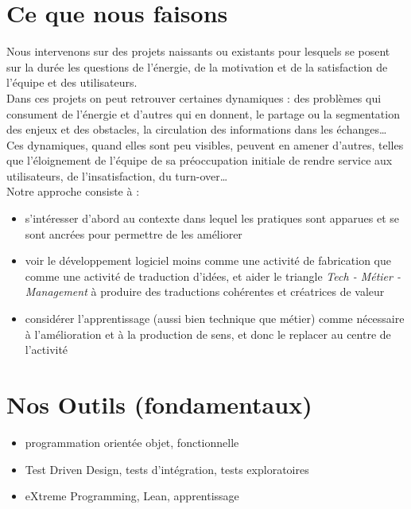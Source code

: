 \documentclass[12pt,svgnames]{article}
\begin{document}
\thispagestyle{empty}
{\selectfont
    \section*{Ce que nous faisons}
    Nous intervenons sur des projets naissants ou existants pour lesquels se posent sur la durée les questions de l'énergie, de la motivation et de la satisfaction de l'équipe et des utilisateurs.\\

    Dans ces projets on peut retrouver certaines dynamiques : des problèmes qui consument de l'énergie et d'autres qui en donnent, le partage ou la segmentation des enjeux et des obstacles, la circulation des informations dans les échanges\ldots{} Ces dynamiques, quand elles sont peu visibles, peuvent en amener d'autres, telles que l'éloignement de l'équipe de sa préoccupation initiale de rendre service aux utilisateurs, de l'insatisfaction, du turn-over\ldots{}\\

    Notre approche consiste à :
    \begin{itemize}
        \item s'intéresser d'abord au contexte dans lequel les pratiques sont apparues et se sont ancrées pour permettre de les améliorer 
        \item voir le développement logiciel moins comme une activité de fabrication que comme une activité de traduction d'idées, et aider le triangle \emph{Tech - Métier - Management} à produire des traductions cohérentes et créatrices de valeur
        \item considérer l'apprentissage (aussi bien technique que métier) comme nécessaire à l'amélioration et à la production de sens, et donc le replacer au centre de l'activité
    \end{itemize}
    \section*{Nos Outils (fondamentaux)}
    \begin{itemize}
        \item
            programmation orientée objet, fonctionnelle
        \item
            Test Driven Design, tests d'intégration, tests exploratoires
        \item
            eXtreme Programming, Lean, apprentissage
    \end{itemize}
}
\end{document}
